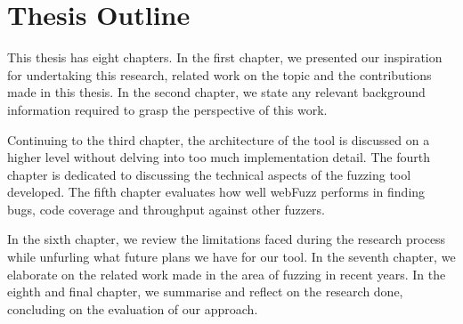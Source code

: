  \section{Thesis Outline}
This thesis has eight chapters. In the first chapter, we presented our inspiration for undertaking this research, related work on the topic and the contributions made in this thesis. In the second chapter, we state any relevant background information required to grasp the perspective of this work. 

Continuing to the third chapter, the architecture of the tool is discussed on a higher level without delving into too much implementation detail. The fourth chapter is dedicated to discussing the technical aspects of the fuzzing tool developed. The fifth chapter evaluates how well webFuzz performs in finding bugs, code coverage and throughput against other fuzzers. 

In the sixth chapter, we review the limitations faced during the research process while unfurling what future plans we have for our tool. In the seventh chapter, we elaborate on the related work made in the area of fuzzing in recent years. In the eighth and final chapter, we summarise and reflect on the research done, concluding on the evaluation of our approach.